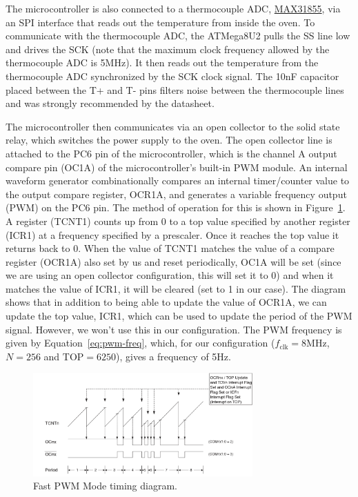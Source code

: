 \documentclass[11pt,twoside,a4paper]{report}
\begin{document}
The microcontroller is also connected to a thermocouple ADC,
\href{https://datasheets.maximintegrated.com/en/ds/MAX31855.pdf}{MAX31855}, via an SPI interface
that reads out the temperature from inside the oven. To communicate with the thermocouple ADC, the
ATMega8U2 pulls the SS line low and drives the SCK (note that the maximum clock frequency allowed by
the thermocouple ADC is 5MHz). It then reads out the temperature from the thermocouple ADC
synchronized by the SCK clock signal. The 10nF capacitor placed between the T+ and T- pins filters
noise between the thermocouple lines and was strongly recommended by the datasheet.\newline

The microcontroller then communicates via an open collector to the solid state relay, which switches
the power supply to the oven. The open collector line is attached to the PC6 pin of the
microcontroller, which is the channel A output compare pin (OC1A) of the microcontroller's built-in
PWM module. An internal waveform generator combinationally compares an internal timer/counter value
to the output compare register, OCR1A, and generates a variable frequency output (PWM) on the PC6
pin. The method of operation for this is shown in Figure~\ref{fig:fast-pwm}. A register (TCNT1)
counts up from 0 to a top value specified by another register (ICR1) at a frequency specified by a
prescaler. Once it reaches the top value it returns back to 0. When the value of TCNT1 matches the
value of a compare register (OCR1A) also set by us and reset periodically, OC1A will be set (since
we are using an open collector configuration, this will set it to 0) and when it matches the value
of ICR1, it will be cleared (set to 1 in our case). The diagram shows that in addition to being able
to update the value of OCR1A, we can update the top value, ICR1, which can be used to update the
period of the PWM signal. However, we won't use this in our configuration. The PWM frequency is
given by Equation~\ref{eq:pwm-freq}, which, for our configuration ($f_{\text{clk}}=8\text{MHz}$,
$N=256$ and $\text{TOP}=6250$), gives a frequency of 5Hz.

\begin{figure}[h]
  \centering
  \includegraphics[width=0.75\textwidth]{data/fast-pwm.png}
  \caption{Fast PWM Mode timing diagram.}
  \label{fig:fast-pwm}
\end{figure}
\end{document}
